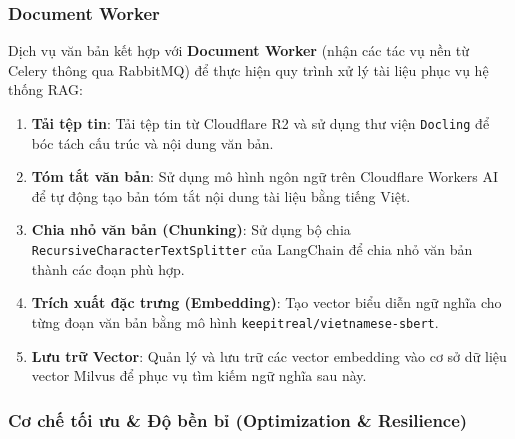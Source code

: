 \subsubsection{Document Worker}

Dịch vụ văn bản kết hợp với \textbf{Document Worker} (nhận các tác vụ nền từ Celery thông qua RabbitMQ) để thực hiện quy trình xử lý tài liệu phục vụ hệ thống RAG:

\begin{enumerate}
\item \textbf{Tải tệp tin}: Tải tệp tin từ Cloudflare R2 và sử dụng thư viện \texttt{Docling} để bóc tách cấu trúc và nội dung văn bản.
\item \textbf{Tóm tắt văn bản}: Sử dụng mô hình ngôn ngữ trên Cloudflare Workers AI để tự động tạo bản tóm tắt nội dung tài liệu bằng tiếng Việt.
\item \textbf{Chia nhỏ văn bản (Chunking)}: Sử dụng bộ chia \texttt{RecursiveCharacterTextSplitter} của LangChain để chia nhỏ văn bản thành các đoạn phù hợp.
\item \textbf{Trích xuất đặc trưng (Embedding)}: Tạo vector biểu diễn ngữ nghĩa cho từng đoạn văn bản bằng mô hình \texttt{keepitreal/vietnamese-sbert}.
\item \textbf{Lưu trữ Vector}: Quản lý và lưu trữ các vector embedding vào cơ sở dữ liệu vector Milvus để phục vụ tìm kiếm ngữ nghĩa sau này.
\end{enumerate}

\subsubsection{Cơ chế tối ưu \& Độ bền bỉ (Optimization \& Resilience)}

